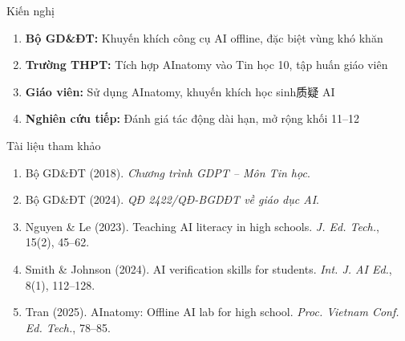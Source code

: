 \documentclass[10pt,xcolor=dvipsnames]{beamer}
\begin{document}
\begin{frame}{Kiến nghị}
  \begin{enumerate}
    \item \textbf{Bộ GD\&ĐT:} Khuyến khích công cụ AI offline, đặc biệt vùng khó khăn
    \item \textbf{Trường THPT:} Tích hợp AInatomy vào Tin học 10, tập huấn giáo viên
    \item \textbf{Giáo viên:} Sử dụng AInatomy, khuyến khích học sinh质疑 AI
    \item \textbf{Nghiên cứu tiếp:} Đánh giá tác động dài hạn, mở rộng khối 11--12
  \end{enumerate}
\end{frame}

\begin{frame}{Tài liệu tham khảo}
  \small
  \begin{enumerate}
    \item Bộ GD\&ĐT (2018). \textit{Chương trình GDPT -- Môn Tin học}.
    \item Bộ GD\&ĐT (2024). \textit{QĐ 2422/QĐ-BGDĐT về giáo dục AI}.
    \item Nguyen \& Le (2023). Teaching AI literacy in high schools. \textit{J. Ed. Tech.}, 15(2), 45--62.
    \item Smith \& Johnson (2024). AI verification skills for students. \textit{Int. J. AI Ed.}, 8(1), 112--128.
    \item Tran (2025). AInatomy: Offline AI lab for high school. \textit{Proc. Vietnam Conf. Ed. Tech.}, 78--85.
  \end{enumerate}
\end{frame}
\end{document}
